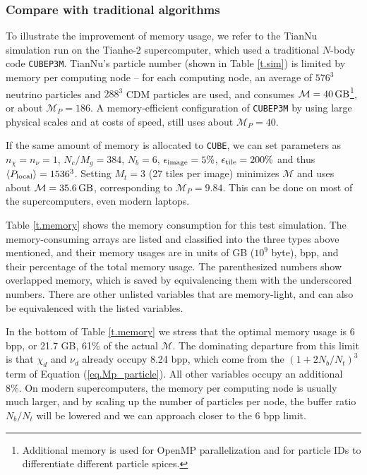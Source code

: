 \documentclass[10pt,twocolumn,reprint]{emulateapj}
\begin{document}
\subsubsection{Compare with traditional algorithms}
To illustrate the improvement of memory usage, we refer to the TianNu simulation \citep{2017NatAs...1E.143Y} run on the Tianhe-2 supercomputer, which used a traditional $N$-body code {\tt CUBEP3M}. TianNu's particle number (shown in Table \ref{t.sim}) is limited by memory per computing node -- for each computing node, an average of $576^3$ neutrino particles and $288^3$ CDM particles are used, and consumes $\mathcal{M}=40\,{\rm GB}$\footnote{Additional memory is used for OpenMP parallelization and for particle IDs to differentiate different particle spices.}, or about $\mathcal{M}_P=186$. A memory-efficient configuration of {\tt CUBEP3M} by using large physical scales and at costs of speed, still uses about $\mathcal{M}_P=40$.

If the same amount of memory is allocated to {\tt CUBE}, we can set parameters as $n_\chi=n_\nu=1$, $N_c/M_g=384$, $N_b=6$, $\epsilon_{\rm image}=5\%$, $\epsilon_{\rm tile}=200\%$ and thus $\left\langle P_{\rm local}\right\rangle=1536^3$. Setting $M_t=3$ (27 tiles per image) minimizes $\mathcal{M}$ and uses about $\mathcal{M}=35.6\,{\rm GB}$, corresponding to $\mathcal{M}_P=9.84$. This can be done on most of the supercomputers, even modern laptops.

Table \ref{t.memory} shows the memory consumption for this test simulation. The memory-consuming arrays are listed and classified into the three types above mentioned, and their memory usages are in units of GB ($10^9$ byte), bpp, and their percentage of the total memory usage. The parenthesized numbers show overlapped memory, which is saved by equivalencing them with the underscored numbers. There are other unlisted variables that are memory-light, and can also be equivalenced with the listed variables. 

In the bottom of Table \ref{t.memory} we stress that the optimal memory usage is 6 bpp, or 21.7 GB, 61\% of the actual $\mathcal{M}$. The dominating departure from this limit is that $\chi_d$ and $\nu_d$ already occupy 8.24 bpp, which come from the $(1+2N_b/N_t)^3$ term of Equation (\ref{eq.Mp_particle}). All other variables occupy an additional 8\%. On modern supercomputers, the memory per computing node is usually much larger, and by scaling up the number of particles per node, the buffer ratio $N_b/N_t$ will be lowered and we can approach closer to the 6 bpp limit.
\end{document}
